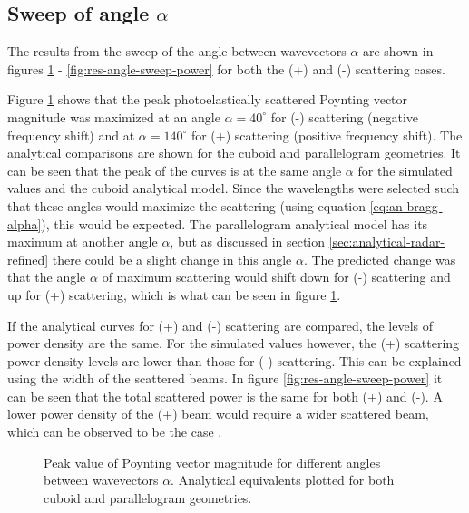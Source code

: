 \documentclass[11pt,twoside]{eitExjobb}
\begin{document}
	\subsection{Sweep of angle $\alpha$}
	The results from the sweep of the angle between wavevectors $\alpha$ are shown in figures \ref{fig:res-angle-sweep-peak} - \ref{fig:res-angle-sweep-power} for both the (+) and (-) scattering cases.
	
	Figure \ref{fig:res-angle-sweep-peak} shows that the peak photoelastically scattered Poynting vector magnitude was maximized at an angle $\alpha = 40^\circ$ for (-) scattering (negative frequency shift) and at $\alpha = 140^\circ$ for (+) scattering (positive frequency shift). The analytical comparisons are shown for the cuboid and parallelogram geometries. It can be seen that the peak of the curves is at the same angle $\alpha$ for the simulated values and the cuboid analytical model. Since the wavelengths were selected such that these angles would maximize the scattering (using equation \eqref{eq:an-bragg-alpha}), this would be expected. The parallelogram analytical model has its maximum at another angle $\alpha$, but as discussed in section \ref{sec:analytical-radar-refined} there could be a slight change in this angle $\alpha$. The predicted change was that the angle $\alpha$ of maximum scattering would shift down for (-) scattering and up for (+) scattering, which is what can be seen in figure \ref{fig:res-angle-sweep-peak}.
	
	If the analytical curves for (+) and (-) scattering are compared, the levels of power density are the same. For the simulated values however, the (+) scattering power density levels are lower than those for (-) scattering. This can be explained using the width of the scattered beams. In figure \ref{fig:res-angle-sweep-power} it can be seen that the total scattered power is the same for both (+) and (-). A lower power density of the (+) beam would require a wider scattered beam, which can be observed to be the case .
	
	\begin{figure}[H]
		\centering
		\begin{subfigure}{\textwidth}
			\resizebox{\textwidth}{!}{
				
			}
		\end{subfigure}
		\begin{subfigure}{\textwidth}
			\resizebox{\textwidth}{!}{
				
			}
		\end{subfigure}
		\caption{\label{fig:res-angle-sweep-peak} Peak value of Poynting vector magnitude for different angles between wavevectors $\alpha$. Analytical equivalents plotted for both cuboid and parallelogram geometries.}
	\end{figure}
	
\end{document}
